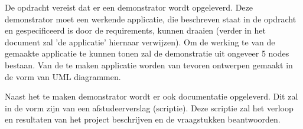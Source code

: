 \documentclass{../local}
\begin{document}
De opdracht vereist dat er een demonstrator wordt opgeleverd. Deze demonstrator moet een werkende applicatie, die beschreven staat in de opdracht en gespecificeerd is door de requirements, kunnen draaien (verder in het document zal 'de applicatie' hiernaar verwijzen). Om de werking te van de gemaakte applicatie te kunnen tonen zal de demonstratie uit ongeveer 5 nodes bestaan. Van de te maken applicatie worden van tevoren ontwerpen gemaakt in de vorm van UML diagrammen.

Naast het te maken demonstrator wordt er ook documentatie opgeleverd. Dit zal in de vorm zijn van een afstudeerverslag (scriptie). Deze scriptie zal het verloop en resultaten van het project beschrijven en de vraagstukken beantwoorden.
\end{document}
